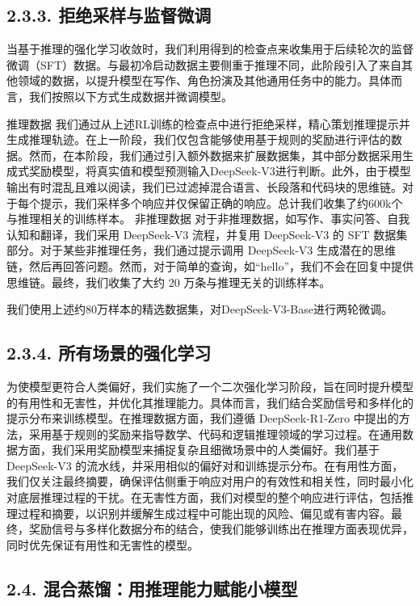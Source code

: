 \documentclass[12pt,a4paper]{report} %
\begin{document}
\subsection*{2.3.3. 拒绝采样与监督微调}


当基于推理的强化学习收敛时，我们利用得到的检查点来收集用于后续轮次的监督微调（SFT）数据。与最初冷启动数据主要侧重于推理不同，此阶段引入了来自其他领域的数据，以提升模型在写作、角色扮演及其他通用任务中的能力。具体而言，我们按照以下方式生成数据并微调模型。


推理数据 我们通过从上述RL训练的检查点中进行拒绝采样，精心策划推理提示并生成推理轨迹。在上一阶段，我们仅包含能够使用基于规则的奖励进行评估的数据。然而，在本阶段，我们通过引入额外数据来扩展数据集，其中部分数据采用生成式奖励模型，将真实值和模型预测输入DeepSeek-V3进行判断。此外，由于模型输出有时混乱且难以阅读，我们已过滤掉混合语言、长段落和代码块的思维链。对于每个提示，我们采样多个响应并仅保留正确的响应。总计我们收集了约600k个与推理相关的训练样本。
非推理数据 对于非推理数据，如写作、事实问答、自我认知和翻译，我们采用 DeepSeek-V3 流程，并复用 DeepSeek-V3 的 SFT 数据集部分。对于某些非推理任务，我们通过提示调用 DeepSeek-V3 生成潜在的思维链，然后再回答问题。然而，对于简单的查询，如“hello”，我们不会在回复中提供思维链。最终，我们收集了大约 20 万条与推理无关的训练样本。


我们使用上述约80万样本的精选数据集，对DeepSeek-V3-Base进行两轮微调。


\subsection*{2.3.4. 所有场景的强化学习}


为使模型更符合人类偏好，我们实施了一个二次强化学习阶段，旨在同时提升模型的有用性和无害性，并优化其推理能力。具体而言，我们结合奖励信号和多样化的提示分布来训练模型。在推理数据方面，我们遵循 DeepSeek-R1-Zero 中提出的方法，采用基于规则的奖励来指导数学、代码和逻辑推理领域的学习过程。在通用数据方面，我们采用奖励模型来捕捉复杂且细微场景中的人类偏好。我们基于 DeepSeek-V3 的流水线，并采用相似的偏好对和训练提示分布。在有用性方面，我们仅关注最终摘要，确保评估侧重于响应对用户的有效性和相关性，同时最小化对底层推理过程的干扰。在无害性方面，我们对模型的整个响应进行评估，包括推理过程和摘要，以识别并缓解生成过程中可能出现的风险、偏见或有害内容。最终，奖励信号与多样化数据分布的结合，使我们能够训练出在推理方面表现优异，同时优先保证有用性和无害性的模型。


\subsection*{2.4. 混合蒸馏：用推理能力赋能小模型}
\end{document}
